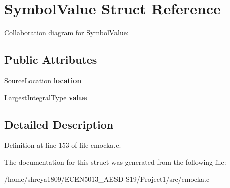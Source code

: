 \hypertarget{structSymbolValue}{}\section{Symbol\+Value Struct Reference}
\label{structSymbolValue}


Collaboration diagram for Symbol\+Value\+:
\subsection*{Public Attributes}
\begin{DoxyCompactItemize}
\item 
\mbox{\label{structSymbolValue_a9d841d4c3b663a12c9bf0056d6664b41}} 
\hyperlink{structSourceLocation}{Source\+Location} {\bfseries location}
\item 
\mbox{\label{structSymbolValue_aaa77effaf2204ad1b18f6a2379590750}} 
Largest\+Integral\+Type {\bfseries value}
\end{DoxyCompactItemize}


\subsection{Detailed Description}


Definition at line 153 of file cmocka.\+c.



The documentation for this struct was generated from the following file\+:\begin{DoxyCompactItemize}
\item 
/home/shreya1809/\+E\+C\+E\+N5013\+\_\+\+A\+E\+S\+D-\/\+S19/\+Project1/src/cmocka.\+c\end{DoxyCompactItemize}
